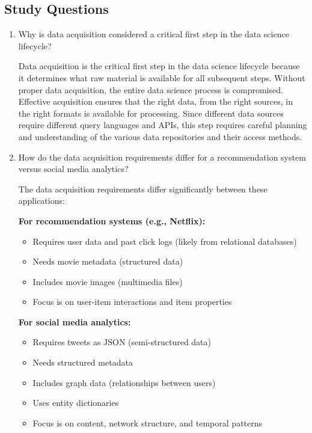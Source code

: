 \documentclass[12pt]{article}
\begin{document}
\subsection{Study Questions}

\begin{enumerate}
    \item Why is data acquisition considered a critical first step in the data science lifecycle?
    
    \begin{tcolorbox}[colback=blue!5!white,colframe=blue!75!black,title={Solution}]
    Data acquisition is the critical first step in the data science lifecycle because it determines what raw material is available for all subsequent steps. Without proper data acquisition, the entire data science process is compromised. Effective acquisition ensures that the right data, from the right sources, in the right formats is available for processing. Since different data sources require different query languages and APIs, this step requires careful planning and understanding of the various data repositories and their access methods.
    \end{tcolorbox}
    
    \item How do the data acquisition requirements differ for a recommendation system versus social media analytics?
    
    \begin{tcolorbox}[colback=blue!5!white,colframe=blue!75!black,title={Solution}]
    The data acquisition requirements differ significantly between these applications:
    
    \textbf{For recommendation systems (e.g., Netflix):}
    \begin{itemize}
        \item Requires user data and past click logs (likely from relational databases)
        \item Needs movie metadata (structured data)
        \item Includes movie images (multimedia files)
        \item Focus is on user-item interactions and item properties
    \end{itemize}
    
    \textbf{For social media analytics:}
    \begin{itemize}
        \item Requires tweets as JSON (semi-structured data)
        \item Needs structured metadata
        \item Includes graph data (relationships between users)
        \item Uses entity dictionaries
        \item Focus is on content, network structure, and temporal patterns
    \end{itemize}
    

\end{tcolorbox}
\end{enumerate}
\end{document}
